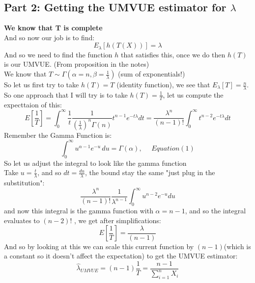 \documentclass[12pt]{article}
\begin{document}
\subsection*{Part 2: Getting the UMVUE estimator for $\lambda$}
\textbf{We know that T is complete}\\ 
And so now our job is to find: 
\[
E_\lambda[h(T(X))] = \lambda
\]
And so we need to find the function $h$ that satisfies this, once we do then $h(T)$ is our UMVUE. (From proposition in the notes) \\
We know that $T \sim \Gamma(\alpha = n, \beta = \frac{1}{\lambda})$ (sum of exponentials!)\\ 
So let us first try to take $h(T)=T$ (identity function), 
we see that $E_\lambda[T] = \frac{n}{\lambda}$. \\ 
So one approach that I will try is to take $h(T) = \frac{1}{T}$, let us compute the expecttaion of this: 
\[
E[\frac{1}{T}] = \int_{0}^{\infty} \frac{1}{t} \frac{1}{(\frac{1}{\lambda})^n \Gamma(n)} t^{n-1} e^{-t\lambda} dt = \frac{\lambda^n}{(n-1)!} \int_{0}^{\infty} t^{n-2}e^{-t\lambda}dt
\]
Remember the Gamma Function is:
\[
  \int_0^\infty u^{\alpha - 1} e^{-u} \, du = \Gamma(\alpha), \ \ \ \ \ \ Equation(1)
\]
So let us adjust the integral to look like the gamma function\\
Take $u = \frac{t}{\lambda}$, and so $dt = \frac{du}{\lambda}$, the bound stay the same "just plug in the substitution":
\[
  \frac{\lambda^n}{(n-1)!}\frac{1}{\lambda^{n-1}}\int_{0}^{\infty} u^{n-2}e^{-u}du
\]
and now this integral is the gamma function with $\alpha=n-1$, and so the integral evaluates to $(n-2)!$ , we get after simplifications:
\[
 E[\frac{1}{T}] = \frac{\lambda}{(n-1)}
\]
And so by looking at this we can scale this current function by $(n-1)$(which is a constant so it doesn't affect the expectation) to get the UMVUE estimator:
\[
\hat{\lambda}_{UMVUE} = (n-1)\frac{1}{T} = \frac{n-1}{\sum_{i=1}^{n}X_i}
\]
\end{document}
